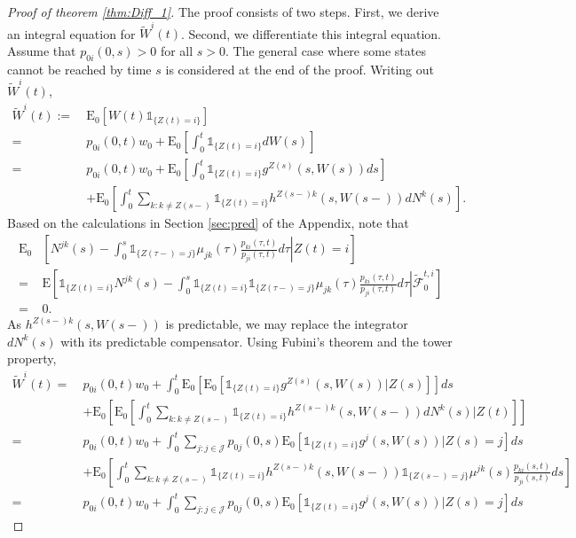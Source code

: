 \documentclass[12pt]{article}
\newcommand{\E}{\text{E}}
\newcommand{\indic}[1]{\mathds{1}_{ \{ #1 \} }}
\theoremstyle{my_thm}
\theoremstyle{my_rem}
\begin{document}
\begin{proof}[Proof of theorem \ref{thm:Diff_1}]
The proof consists of two steps. First, we derive an integral equation for $\tilde{W}^i(t)$. Second, we differentiate this integral equation. \\
Assume that $p_{0i}(0,s)>0$ for all $s>0$. The general case where some states cannot be reached by time $s$ is considered at the end of the proof. Writing out $\tilde{W}^i(t)$,
\begin{align*}
\tilde{W}^i(t):= \ &\E_0[W(t) \indic{Z(t)=i}]
\\
= \ &
p_{0i}(0,t)w_0+\E_0 \left[ \int_0^t \indic{Z(t)=i} dW(s) \right]
\\
= \ &
p_{0i}(0,t)w_0+\E_0 \left[ \int_0^t \indic{Z(t)=i} g^{Z(s)}(s,W(s))ds \right]
\\
&+
\E_0 \left[ \int_0^t \sum_{k:k \neq Z(s-)} \indic{Z(t)=i} h^{Z(s-)k}(s,W(s-)) dN^k(s)  \right].
\end{align*}
Based on the calculations in Section \ref{sec:pred} of the Appendix, note that 
\begin{align*}
\E_0 & \left. \left[ N^{jk}(s) - \int_0^s \indic{Z(\tau-)=j} \mu_{jk}(\tau)\frac{p_{ki}(\tau,t)}{p_{ji}(\tau,t)} d\tau \right| Z(t)=i \right] 
\\
= \ &
\E \left. \left[ \indic{Z(t)=i}N^{jk}(s) - \int_0^s \indic{Z(t)=i} \indic{Z(\tau-)=j} \mu_{jk}(\tau)\frac{p_{ki}(\tau,t)}{p_{ji}(\tau,t)} d\tau \right| \tilde{\mathcal{F}}_0^{t,i} \right]  
\\
= \ & 0.
\end{align*}
As $h^{Z(s-)k}(s,W(s-))$ is predictable, we may replace the integrator $dN^k(s)$ with its predictable compensator. Using Fubini's theorem and the tower property,
\begin{align}
\tilde{W}^i(t)= \ & p_{0i}(0,t)w_0+
\nonumber \int_0^t \E_0 \left[ \E_0 \left[ \indic{Z(t)=i} g^{Z(s)}(s,W(s))|Z(s) \right]\right] ds
\\
&+
\nonumber \E_0 \left[ \E_0 \left[ \int_0^t \sum_{k:k \neq Z(s-)}\indic{Z(t)=i} h^{Z(s-)k}(s,W(s-)) dN^k(s) |Z(t) \right] \right] 
\\
= \ &
 p_{0i}(0,t)w_0+
\nonumber \int_0^t \sum_{j:j \in \mathcal{J}} p_{0j}(0,s) \E_0 \left[ \indic{Z(t)=i} g^{j}(s,W(s))|Z(s)=j \right]  ds
\\
&+
\nonumber \E_0 \left[ \int_0^t \sum_{k:k \neq Z(s-)}\indic{Z(t)=i} h^{Z(s-)k}(s,W(s-)) \indic{Z(s-)=j} \mu^{jk}(s) \frac{p_{ki}(s,t)}{p_{ji}(s,t)}ds \right] 
\\
= \ &
p_{0i}(0,t)w_0+
\nonumber \int_0^t \sum_{j:j \in \mathcal{J}} p_{0j}(0,s) \E_0 \left[ \indic{Z(t)=i} g^{j}(s,W(s))|Z(s)=j \right] ds

\end{align}
\end{proof}
\end{document}
